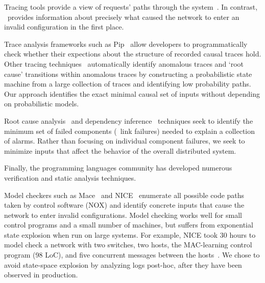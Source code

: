Tracing tools provide a view
of requests' paths through the
system~\cite{handigol2012debugger,fonseca2007x}. In contrast, \simulator~provides
information about precisely what caused the network to
enter an invalid
configuration in the first place.

Trace analysis frameworks such as Pip~\cite{pip} allow developers
to programmatically check whether their expections about the structure of
recorded causal
traces hold. Other tracing techniques~\cite{barham2004using} automatically identify anomalous
traces and `root cause' transitions within anomalous traces by constructing
a probabilistic state machine from a large collection of traces and
identifying low probability paths.
Our approach identifies the exact minimal causal set of inputs without
depending on probabilistic models.

Root cause analysis~\cite{yemini1996} and dependency inference~\cite{Kandula:2009:DDE:1592568.1592597}
techniques seek to identify the minimum set of failed
components (\eg~link failures) needed to explain a collection of alarms. Rather than
focusing on individual component failures, we seek to minimize inputs that affect the behavior
of the overall distributed system.


Finally, the programming languages community has developed
numerous verification and static analysis techniques.


Model checkers such as Mace~\cite{Killian:2007:MLS:1250734.1250755} and NICE~\cite{nice} enumerate all possible code paths taken by control software (NOX)
and identify concrete inputs that cause
the network to enter invalid configurations. Model checking works well for small
control programs and a small number of machines, but suffers from exponential
state explosion when run on large systems. For example, NICE took 30 hours to
model check a network with two switches, two hosts, the MAC-learning
control program (98 LoC), and five concurrent
messages between the hosts~\cite{nice}. We chose to avoid state-space explosion by analyzing logs
post-hoc, after they have been observed in production.



